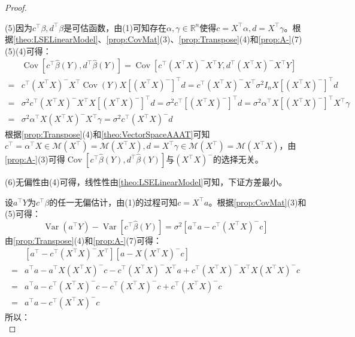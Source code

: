 \begin{proof}
\begin{equation*}
	\end{equation*}\par
	(5)因为$c^{\top}\beta,d^{\top}\beta$是可估函数，由(1)可知存在$\alpha,\gamma\in\mathbb{R}^{n}$使得$c=X^{\top}\alpha,d=X^{\top}\gamma$。根据\cref{theo:LSELinearModel}、\cref{prop:CovMat}(3)、\cref{prop:Transpose}(4)和\cref{prop:A-}(7)(5)(4)可得：
	\begin{align*}
		&\operatorname{Cov}[c^{\top}\hat{\beta}(Y),d^{\top}\hat{\beta}(Y)]=\operatorname{Cov}[c^{\top}(X^{\top}X)^-X^{\top}Y,d^{\top}(X^{\top}X)^-X^{\top}Y] \\
		=&c^{\top}(X^{\top}X)^-X^{\top}\operatorname{Cov}(Y)X[(X^{\top}X)^-]^{\top}d =c^{\top}(X^{\top}X)^-X^{\top}\sigma^2I_nX[(X^{\top}X)^-]^{\top}d \\
		=&\sigma^2c^{\top}(X^{\top}X)^-X^{\top}X[(X^{\top}X)^-]^{\top}d=\sigma^2c^{\top}[(X^{\top}X)^-]^{\top}d=\sigma^2\alpha^{\top}X[(X^{\top}X)^-]^{\top}X^{\top}\gamma \\
		=&\sigma^2\alpha^{\top}X(X^{\top}X)^-X^{\top}\gamma=\sigma^2c^{\top}(X^{\top}X)^-d
	\end{align*}
	根据\cref{prop:Transpose}(4)和\cref{theo:VectorSpaceAAAT}可知$c^{\top}=\alpha^{\top}X\in\mathcal{M}(X^{\top})=\mathcal{M}(X^{\top}X),d=X^{\top}\gamma\in\mathcal{M}(X^{\top})=\mathcal{M}(X^{\top}X)$，由\cref{prop:A-}(3)可得$\operatorname{Cov}[c^{\top}\hat{\beta}(Y),d^{\top}\hat{\beta}(Y)]$与$(X^{\top}X)^-$的选择无关。\par
	(6)无偏性由(4)可得，线性性由\cref{theo:LSELinearModel}可知，下证方差最小。\par
	设$a^{\top}Y$为$c^{\top}\beta$的任一无偏估计，由(1)的过程可知$c=X^{\top}a$。根据\cref{prop:CovMat}(3)和(5)可得：
	\begin{equation*}
		\operatorname{Var}(a^{\top}Y)-\operatorname{Var}[c^{\top}\hat{\beta}(Y)]=\sigma^2[a^{\top}a-c^{\top}(X^{\top}X)^-c]
	\end{equation*}
	由\cref{prop:Transpose}(4)和\cref{prop:A-}(7)可得：
	\begin{align*}
		&[a^{\top}-c^{\top}(X^{\top}X)^-X^{\top}][a-X(X^{\top}X)^-c] \\
		=&a^{\top}a-a^{\top}X(X^{\top}X)^-c-c^{\top}(X^{\top}X)^-X^{\top}a+c^{\top}(X^{\top}X)^-X^{\top}X(X^{\top}X)^-c \\
		=&a^{\top}a-c^{\top}(X^{\top}X)^-c-c^{\top}(X^{\top}X)^-c+c^{\top}(X^{\top}X)^-c \\
		=&a^{\top}a-c^{\top}(X^{\top}X)^-c
	\end{align*}
	所以：
	\begin{equation*}

\end{equation*}
\end{proof}
